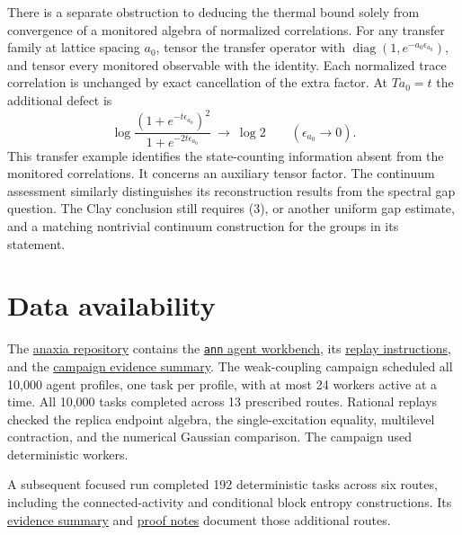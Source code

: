 \documentclass[11pt]{amsart}
\begin{document}
There is a separate obstruction to deducing the thermal bound solely from
convergence of a monitored algebra of normalized correlations. For any
transfer family at lattice spacing \(a_0\), tensor the transfer operator
with \(\operatorname{diag}(1,e^{-a_0\epsilon_{a_0}})\), and tensor every
monitored observable with the identity. Each normalized trace correlation
is unchanged by exact cancellation of the extra factor. At \(T a_0=t\)
the additional defect is
\[
 \log\frac{(1+e^{-t\epsilon_{a_0}})^2}{1+e^{-2t\epsilon_{a_0}}}
 \ \longrightarrow\ \log 2
 \qquad (\epsilon_{a_0}\to0).
\]
This transfer example identifies the state-counting information absent
from the monitored correlations. It concerns an auxiliary tensor factor.
The continuum assessment \cite{Assessment} similarly distinguishes its
reconstruction results from the spectral gap question.
The Clay conclusion still requires (3), or another uniform gap estimate,
and a matching nontrivial continuum construction for the groups in its
statement.

\section*{Data availability}

The \href{https://github.com/anaxia-research/anaxia}{anaxia repository}
contains the \href{https://github.com/anaxia-research/anaxia/tree/main/anaxia/ann}{\texttt{ann} agent workbench},
its \href{https://github.com/anaxia-research/anaxia/blob/main/docs/ANN.md}{replay instructions},
and the \href{https://github.com/anaxia-research/anaxia/blob/main/research/weak-coupling-seams/evidence.json}{campaign evidence summary}.
The weak-coupling campaign scheduled all 10,000 agent profiles, one task
per profile, with at most 24 workers active at a time. All 10,000 tasks
completed across 13 prescribed routes. Rational replays checked the
replica endpoint algebra, the single-excitation equality, multilevel
contraction, and the numerical Gaussian comparison. The campaign
used deterministic workers.

A subsequent focused run completed 192 deterministic tasks across six
routes, including the connected-activity and conditional block entropy
constructions. Its \href{https://github.com/anaxia-research/anaxia/blob/main/research/weak-coupling-seams/constructions-evidence.json}{evidence summary}
and \href{https://github.com/anaxia-research/anaxia/blob/main/docs/ANN-YANG-MILLS-CONSTRUCTIONS.md}{proof notes}
document those additional routes.
\end{document}
